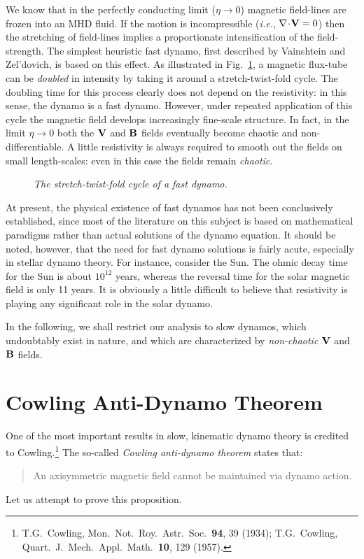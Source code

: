 We know that in the perfectly conducting limit ($\eta\rightarrow 0$) magnetic
field-lines are frozen into an MHD fluid. If the motion is
incompressible ({\em i.e.}, $\nabla\!\cdot\!{\bf V} = 0$) then the stretching
of field-lines implies a proportionate intensification of the field-strength.
The simplest heuristic fast dynamo, first described by Vainshtein and Zel'dovich, 
 is based on this effect. As illustrated in Fig.~\ref{f25}, a magnetic
flux-tube can be {\em doubled} in intensity by taking it around a
stretch-twist-fold cycle. The doubling time for this
process clearly does not depend on the resistivity: in this sense, the
dynamo is a fast dynamo. However, under repeated application of this
cycle the magnetic field develops increasingly fine-scale structure.
In fact, in the limit $\eta\rightarrow 0$ both the ${\bf V}$ and
${\bf B}$ fields eventually become chaotic and non-differentiable.
A little resistivity is always required to smooth out the fields on
small length-scales: even in this case the fields remain {\em chaotic}.

\begin{figure}
\epsfysize=1.75in
\centerline{}
\caption{\em The stretch-twist-fold cycle of a fast dynamo.}\label{f25}
\end{figure}

At present, the physical existence of fast dynamos  has not been
conclusively  established, since most of the literature on this
subject is based on mathematical paradigms rather than actual solutions
of the dynamo equation. It should be noted, however, that the
need for fast dynamo solutions is fairly acute, especially in stellar
dynamo theory. For instance, consider the Sun. The ohmic decay time for the
Sun is about $10^{12}$ years, whereas the reversal time for the solar magnetic
field is only 11 years. It is obviously a little difficult to believe that resistivity
is playing any significant role in the solar dynamo.  

In the following, we shall restrict our analysis to slow dynamos, which
undoubtably exist in nature, and which are characterized by {\em non-chaotic}
${\bf V}$ and ${\bf B}$ fields.

\section{Cowling Anti-Dynamo Theorem}
One of the most important results in slow, kinematic dynamo theory
is credited to Cowling.\footnote{T.G.~Cowling, Mon.\ Not.\ Roy.\ Astr.\ Soc.\
{\bf 94}, 39 (1934); T.G.~Cowling, Quart.\ J.\ Mech.\ Appl.\ Math.\
{\bf 10}, 129 (1957).} The so-called {\em Cowling anti-dynamo theorem}
states that:
\begin{quote}
{\sf An axisymmetric magnetic field cannot be maintained via dynamo action.}
\end{quote}
Let us attempt to prove this proposition.

